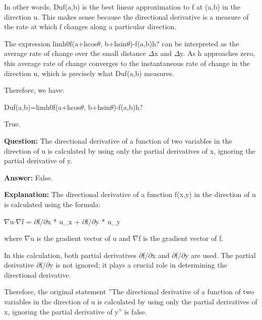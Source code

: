 \documentclass{article}
\begin{document}
In other words, Duf(a,b) is the best linear approximation to f at (a,b) in the direction u. This makes sense because the directional derivative is a measure of the rate at which f changes along a particular direction.

The expression limh{\textrightarrow}0f(a+hcos\ensuremath{\theta}, b+hsin\ensuremath{\theta})-f(a,b)h? can be interpreted as the average rate of change over the small distance \ensuremath{\Delta}x and \ensuremath{\Delta}y. As h approaches zero, this average rate of change converges to the instantaneous rate of change in the direction u, which is precisely what Duf(a,b) measures.

Therefore, we have:

Duf(a,b)=limh{\textrightarrow}0f(a+hcos\ensuremath{\theta}, b+hsin\ensuremath{\theta})-f(a,b)h?

True.
                
                \vspace{0.5cm} 
        
            
                \textbf {Question:} The directional derivative of a function of two variables in the direction of u is calculated by using only the partial derivatives of x, ignoring the partial derivative of y.
                
                \textbf{Answer:} False.

                \textbf{Explanation:} The directional derivative of a function f(x,y) in the direction of u is calculated using the formula:

\ensuremath{\nabla}u\ensuremath{\cdot}\ensuremath{\nabla}f = \ensuremath{\partial}f/\ensuremath{\partial}x * u\_x + \ensuremath{\partial}f/\ensuremath{\partial}y * u\_y

where \ensuremath{\nabla}u is the gradient vector of u and \ensuremath{\nabla}f is the gradient vector of f.

In this calculation, both partial derivatives \ensuremath{\partial}f/\ensuremath{\partial}x and \ensuremath{\partial}f/\ensuremath{\partial}y are used. The partial derivative \ensuremath{\partial}f/\ensuremath{\partial}y is not ignored; it plays a crucial role in determining the directional derivative.

Therefore, the original statement ''The directional derivative of a function of two variables in the direction of u is calculated by using only the partial derivatives of x, ignoring the partial derivative of y'' is false.
                
                \vspace{0.5cm} 
        
\end{document}
